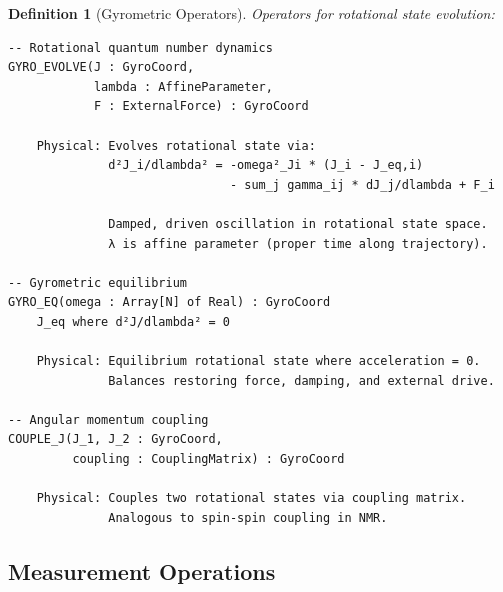 \documentclass[aps,prd,twocolumn,superscriptaddress,floatfix,nofootinbib]{revtex4-2}
\newtheorem{definition}[theorem]{Definition}
\theoremstyle{remark}
\begin{document}
\begin{definition}[Gyrometric Operators]
\label{def:gyro_ops}
Operators for rotational state evolution:
\begin{verbatim}
-- Rotational quantum number dynamics
GYRO_EVOLVE(J : GyroCoord,
            lambda : AffineParameter,
            F : ExternalForce) : GyroCoord
    
    Physical: Evolves rotational state via:
              d²J_i/dlambda² = -omega²_Ji * (J_i - J_eq,i)
                               - sum_j gamma_ij * dJ_j/dlambda + F_i
              
              Damped, driven oscillation in rotational state space.
              λ is affine parameter (proper time along trajectory).

-- Gyrometric equilibrium
GYRO_EQ(omega : Array[N] of Real) : GyroCoord
    J_eq where d²J/dlambda² = 0
    
    Physical: Equilibrium rotational state where acceleration = 0.
              Balances restoring force, damping, and external drive.

-- Angular momentum coupling
COUPLE_J(J_1, J_2 : GyroCoord,
         coupling : CouplingMatrix) : GyroCoord
    
    Physical: Couples two rotational states via coupling matrix.
              Analogous to spin-spin coupling in NMR.
\end{verbatim}
\end{definition}

\subsection{Measurement Operations}
\end{document}
